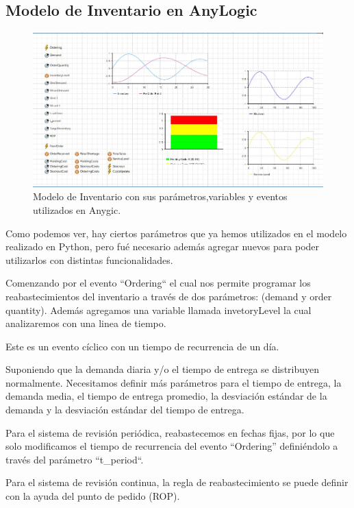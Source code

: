 \subsection{Modelo de Inventario en AnyLogic}
\label{subsec:modelo-de-inventario-en-anylogic}
\begin{figure}[H]
    \includegraphics[width=\linewidth]{images/anylogic-inventario}
    \caption{Modelo de Inventario con sus parámetros,variables y eventos utilizados en Anygic.}
\end{figure}

Como podemos ver, hay ciertos parámetros que ya hemos utilizados en el modelo realizado en Python, pero fué necesario además agregar nuevos para poder utilizarlos con distintas funcionalidades.

Comenzando por el evento ``Ordering`` el cual nos permite programar los reabastecimientos del inventario a través de dos parámetros: (demand y order quantity). Además agregamos una variable llamada invetoryLevel la cual analizaremos con una linea de tiempo.

Este es un evento cíclico con un tiempo de recurrencia de un día.

Suponiendo que la demanda diaria y/o el tiempo de entrega se distribuyen normalmente.
Necesitamos definir más  parámetros para el tiempo de entrega, la demanda media, el tiempo de entrega promedio, la desviación estándar de la demanda y la desviación estándar del tiempo de entrega.

Para el sistema de revisión periódica, reabastecemos en fechas fijas, por lo que solo modificamos el tiempo de recurrencia del evento “Ordering” definiéndolo a través del parámetro ``t\_period``.

Para el sistema de revisión continua, la regla de reabastecimiento se puede definir con la ayuda del punto de pedido (ROP).

